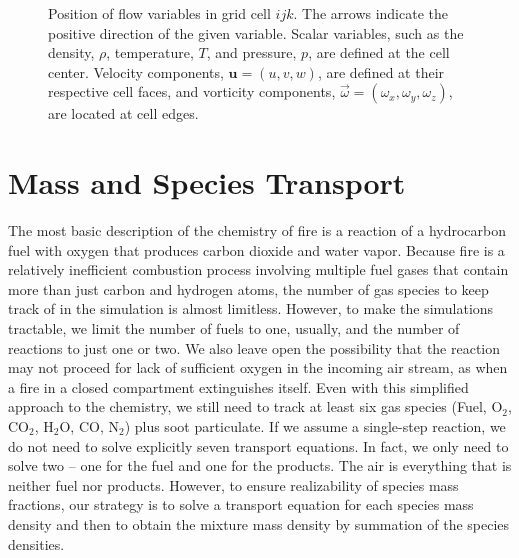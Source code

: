\begin{figure}[!h]
\caption[Position of flow variables in a grid cell]{Position of flow variables in grid cell $ijk$. The arrows indicate the positive direction of the given variable. Scalar variables, such as the density, $\rho$, temperature, $T$, and pressure, $p$, are defined at the cell center. Velocity components, $\mathbf{u}=(u,v,w)$, are defined at their respective cell faces, and vorticity components, $\vec{\omega}=(\omega_x,\omega_y,\omega_z)$, are located at cell edges.}
\label{variable_positions}
\end{figure}

\section{Mass and Species Transport}
\label{sec_lumped_species}

The most basic description of the chemistry of fire is a reaction of a hydrocarbon fuel with oxygen that produces carbon dioxide and water vapor. Because fire is a relatively inefficient combustion process involving multiple fuel gases that contain more than just carbon and hydrogen atoms, the number of gas species to keep track of in the simulation is almost limitless. However, to make the simulations tractable, we limit the number of fuels to one, usually, and the number of reactions to just one or two. We also leave open the possibility that the reaction may not proceed for lack of sufficient oxygen in the incoming air stream, as when a fire in a closed compartment extinguishes itself. Even with this simplified approach to the chemistry, we still need to track at least six gas species (Fuel, O$_2$, CO$_2$, H$_2$O, CO, N$_2$) plus soot particulate. If we assume a single-step reaction, we do not need to solve explicitly seven transport equations. In fact, we only need to solve two -- one for the fuel and one for the products. The air is everything that is neither fuel nor products. However, to ensure realizability of species mass fractions, our strategy is to solve a transport equation for each species mass density and then to obtain the mixture mass density by summation of the species densities.

